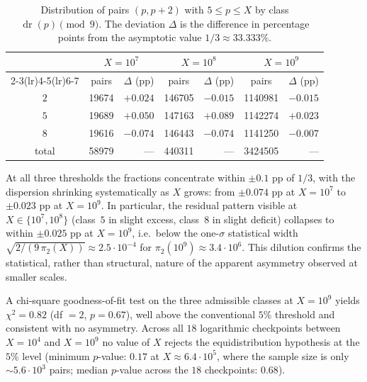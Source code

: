 \documentclass[11pt]{amsart}
\theoremstyle{plain}
\theoremstyle{definition}
\theoremstyle{remark}
\DeclareMathOperator{\dr}{dr}
\begin{document}
\begin{table}[h]
\centering
\caption{Distribution of pairs $(p,p+2)$ with $5 \le p \le X$ by class
$\dr(p) \pmod 9$. The deviation $\Delta$ is the difference in
percentage points from the asymptotic value $1/3 \approx 33.333\%$.}
\label{tab:twins}
\begin{tabular}{@{}c r r r r r r@{}}
\toprule
\multicolumn{1}{c}{}
& \multicolumn{2}{c}{$X = 10^7$}
& \multicolumn{2}{c}{$X = 10^8$}
& \multicolumn{2}{c}{$X = 10^9$} \\
\cmidrule(lr){2-3}\cmidrule(lr){4-5}\cmidrule(lr){6-7}
\multicolumn{1}{c}{class $a$}
& \multicolumn{1}{c}{pairs} & \multicolumn{1}{c}{$\Delta$ (pp)}
& \multicolumn{1}{c}{pairs} & \multicolumn{1}{c}{$\Delta$ (pp)}
& \multicolumn{1}{c}{pairs} & \multicolumn{1}{c}{$\Delta$ (pp)} \\
\midrule
$2$ & \num{19674}  & $+0.024$ & \num{146705} & $-0.015$ & \num{1140981} & $-0.015$ \\
$5$ & \num{19689}  & $+0.050$ & \num{147163} & $+0.089$ & \num{1142274} & $+0.023$ \\
$8$ & \num{19616}  & $-0.074$ & \num{146443} & $-0.074$ & \num{1141250} & $-0.007$ \\
\midrule
total & \num{58979} & --- & \num{440311} & --- & \num{3424505} & --- \\
\bottomrule
\end{tabular}
\end{table}

At all three thresholds the fractions concentrate within $\pm 0.1$ pp
of $1/3$, with the dispersion shrinking systematically as $X$ grows:
from $\pm 0.074$ pp at $X = 10^7$ to $\pm 0.023$ pp at $X = 10^9$. In
particular, the residual pattern visible at $X \in \{10^7,10^8\}$
(class~$5$ in slight excess, class~$8$ in slight deficit) collapses
to within $\pm 0.025$ pp at $X = 10^9$, i.e.\ below the one-$\sigma$
statistical width $\sqrt{2/(9\,\pi_2(X))} \approx 2.5 \cdot 10^{-4}$
for $\pi_2(10^9) \approx 3.4 \cdot 10^6$. This dilution confirms the
statistical, rather than structural, nature of the apparent
asymmetry observed at smaller scales.

A chi-square goodness-of-fit test on the three admissible classes at
$X = 10^9$ yields $\chi^2 = 0.82$ (df $= 2$, $p = 0.67$), well above
the conventional $5\%$ threshold and consistent with no asymmetry.
Across all $18$ logarithmic checkpoints between $X = 10^4$ and
$X = 10^9$ no value of $X$ rejects the equidistribution hypothesis at
the $5\%$ level (minimum $p$-value: $0.17$ at $X \approx 6.4 \cdot
10^5$, where the sample size is only $\sim 5.6 \cdot 10^3$ pairs;
median $p$-value across the $18$ checkpoints: $0.68$).
\end{document}
